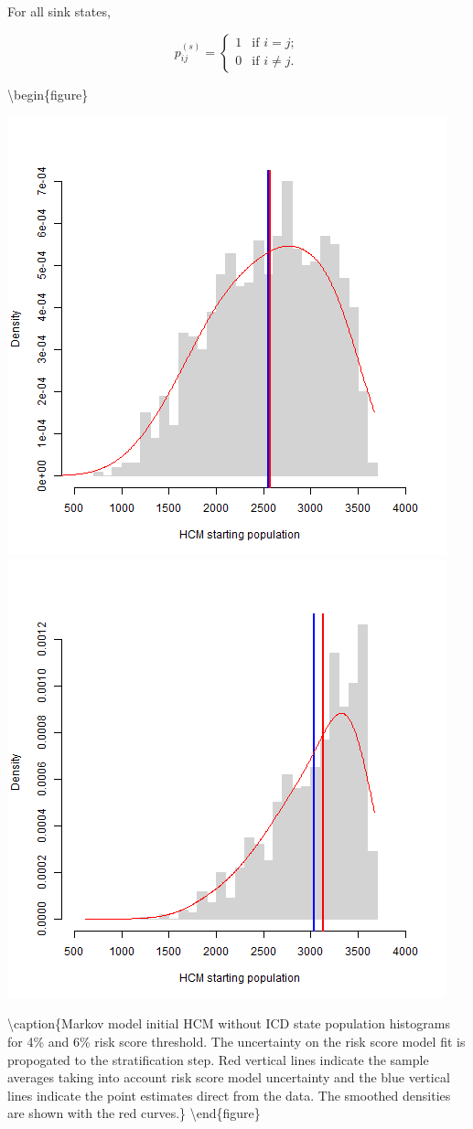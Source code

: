 \documentclass[
]{article}
\begin{document}
For all sink states,

\[
p^{(s)}_{ij} = \left\{
\begin{array}{ll}
1 & \mbox{if $i = j$};\\
0 & \mbox{if $i \neq j$}.
\end{array} \right.
\]

\textbackslash begin\{figure\}

\includegraphics[width=0.5\linewidth]{../../images/init_hist_004}
\includegraphics[width=0.5\linewidth]{../../images/init_hist_006}
\hfill{}

\textbackslash caption\{Markov model initial HCM without ICD state
population histograms for 4\% and 6\% risk score threshold. The
uncertainty on the risk score model fit is propogated to the
stratification step. Red vertical lines indicate the sample averages
taking into account risk score model uncertainty and the blue vertical
lines indicate the point estimates direct from the data. The smoothed
densities are shown with the red curves.\}\label{fig:unnamed-chunk-5}
\textbackslash end\{figure\}
\end{document}
